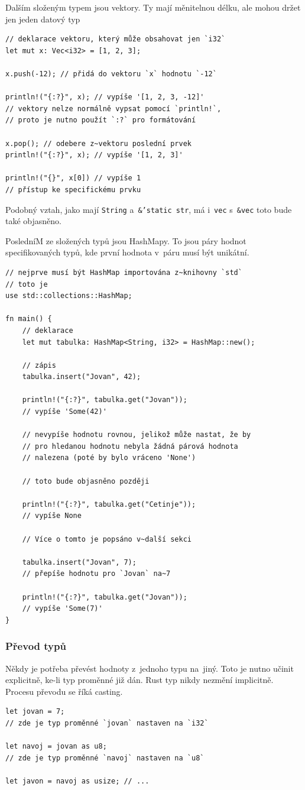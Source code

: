 \documentclass[a4paper, 12pt]{article} %
\newcommand{\rust}[1]{\texttt{#1}}
\begin{document}
            Dalším složeným typem jsou vektory. Ty mají měnitelnou délku, ale mohou držet jen jeden datový typ
            \begin{verbatim}
// deklarace vektoru, který může obsahovat jen `i32`
let mut x: Vec<i32> = [1, 2, 3];

x.push(-12); // přidá do vektoru `x` hodnotu `-12`

println!("{:?}", x); // vypíše '[1, 2, 3, -12]'
// vektory nelze normálně vypsat pomocí `println!`,
// proto je nutno použít `:?` pro formátování

x.pop(); // odebere z~vektoru poslední prvek
println!("{:?}", x); // vypíše '[1, 2, 3]'

println!("{}", x[0]) // vypíše 1
// přístup ke specifickému prvku
            \end{verbatim}
        
            Podobný vztah, jako mají \rust{String} a~\rust{&'static str}, má i~\rust{vec} s~\rust{&vec} toto bude také objasněno.
        
            PosledníM ze složených typů jsou HashMapy. To jsou páry hodnot specifikovaných typů, kde první hodnota v~páru musí být unikátní.
            \begin{verbatim}
// nejprve musí být HashMap importována z~knihovny `std`
// toto je 
use std::collections::HashMap;

fn main() {
    // deklarace
    let mut tabulka: HashMap<String, i32> = HashMap::new();

    // zápis
    tabulka.insert("Jovan", 42); 
    
    println!("{:?}", tabulka.get("Jovan"));
    // vypíše 'Some(42)'

    // nevypíše hodnotu rovnou, jelikož může nastat, že by
    // pro hledanou hodnotu nebyla žádná párová hodnota
    // nalezena (poté by bylo vráceno 'None')
    
    // toto bude objasněno později
    
    println!("{:?}", tabulka.get("Cetinje"));
    // vypíše None

    // Více o tomto je popsáno v~další sekci
    
    tabulka.insert("Jovan", 7);
    // přepíše hodnotu pro `Jovan` na~7
    
    println!("{:?}", tabulka.get("Jovan"));
    // vypíše 'Some(7)'
}
            \end{verbatim}
        
        \subsubsection*{Převod typů}
            Někdy je potřeba převést hodnoty z~jednoho typu na~jiný. Toto je nutno učinit explicitně, ke-li typ proměnné již dán. Rust typ nikdy nezmění implicitně. Procesu převodu se říká casting.
            \begin{verbatim}
let jovan = 7;
// zde je typ proměnné `jovan` nastaven na `i32` 

let navoj = jovan as u8;
// zde je typ proměnné `navoj` nastaven na `u8`

let javon = navoj as usize; // ...
            \end{verbatim}
            
\end{document}
